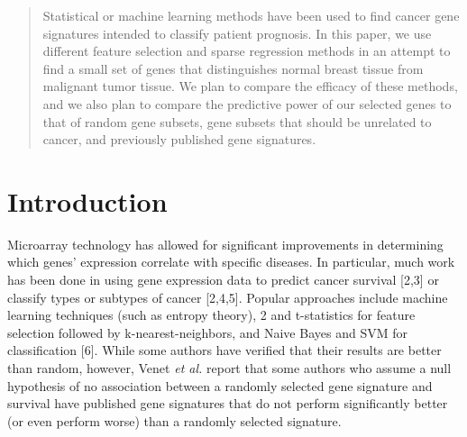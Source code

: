 \documentclass[10.75pt]{article}
\begin{document}
\maketitle

\begin{abstract}
Statistical or machine learning methods have been used to find cancer gene signatures intended to classify patient prognosis. In this paper, we use different feature selection and sparse regression methods in an attempt to find a small set of genes that distinguishes normal breast tissue from malignant tumor tissue. We plan to compare the efficacy of these methods, and we also plan to compare the predictive power of our selected genes to that of random gene subsets, gene subsets that should be unrelated to cancer, and previously published gene signatures.
\end{abstract}

\section{Introduction}

Microarray technology has allowed for significant improvements in determining which genes' expression correlate with specific diseases. In particular, much work has been done in using gene expression data to predict cancer survival [2,3] or classify types or subtypes of cancer [2,4,5]. Popular approaches include machine learning techniques (such as entropy theory), 2 and t-statistics for feature selection followed by k-nearest-neighbors, and Naive Bayes and SVM for classification [6]. While some authors have verified that their results are better than random, however, Venet \emph{et al.} report that some authors who assume a null hypothesis of no association between a randomly selected gene signature and survival have published gene signatures that do not perform significantly better (or even perform worse) than a randomly selected signature\cite{Venet}.%
\end{document}
